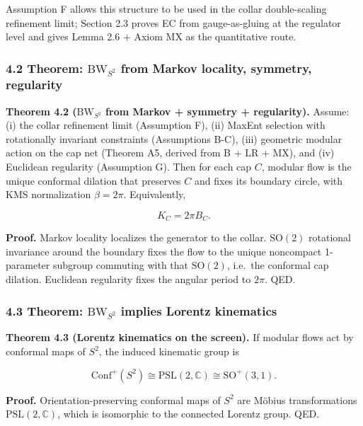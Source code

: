 \documentclass[
]{article}
\begin{document}
Assumption F allows this structure to be used in the collar
double-scaling refinement limit; Section 2.3 proves EC from
gauge-as-gluing at the regulator level and gives Lemma 2.6 + Axiom MX as
the quantitative route.

\subsubsection{\texorpdfstring{4.2 Theorem: \(\mathrm{BW}_{S^2}\) from
Markov locality, symmetry,
regularity}{4.2 Theorem: \textbackslash mathrm\{BW\}\_\{S\^{}2\} from Markov locality, symmetry, regularity}}\label{theorem-mathrmbw_s2-from-markov-locality-symmetry-regularity}

\textbf{Theorem 4.2 (\(\mathrm{BW}_{S^2}\) from Markov + symmetry +
regularity).} Assume: (i) the collar refinement limit (Assumption F),
(ii) MaxEnt selection with rotationally invariant constraints
(Assumptions B-C), (iii) geometric modular action on the cap net
(Theorem A5, derived from B + LR + MX), and (iv) Euclidean regularity
(Assumption G). Then for each cap \(C\), modular flow is the unique
conformal dilation that preserves \(C\) and fixes its boundary circle,
with KMS normalization \(\beta = 2\pi\). Equivalently,

\[
K_C = 2 \pi B_C.
\]

\textbf{Proof.} Markov locality localizes the generator to the collar.
\(\mathrm{SO}(2)\) rotational invariance around the boundary fixes the
flow to the unique noncompact 1-parameter subgroup commuting with that
\(\mathrm{SO}(2)\), i.e.~the conformal cap dilation. Euclidean
regularity fixes the angular period to \(2\pi\). QED.

\subsubsection{\texorpdfstring{4.3 Theorem: \(\mathrm{BW}_{S^2}\)
implies Lorentz
kinematics}{4.3 Theorem: \textbackslash mathrm\{BW\}\_\{S\^{}2\} implies Lorentz kinematics}}\label{theorem-mathrmbw_s2-implies-lorentz-kinematics}

\textbf{Theorem 4.3 (Lorentz kinematics on the screen).} If modular
flows act by conformal maps of \(S^2\), the induced kinematic group is

\[
\mathrm{Conf}^+(S^2) \cong \mathrm{PSL}(2,\mathbb C) \cong \mathrm{SO}^+(3,1).
\]

\textbf{Proof.} Orientation-preserving conformal maps of \(S^2\) are
Möbius transformations \(\mathrm{PSL}(2,\mathbb{C})\), which is
isomorphic to the connected Lorentz group. QED.
\end{document}

